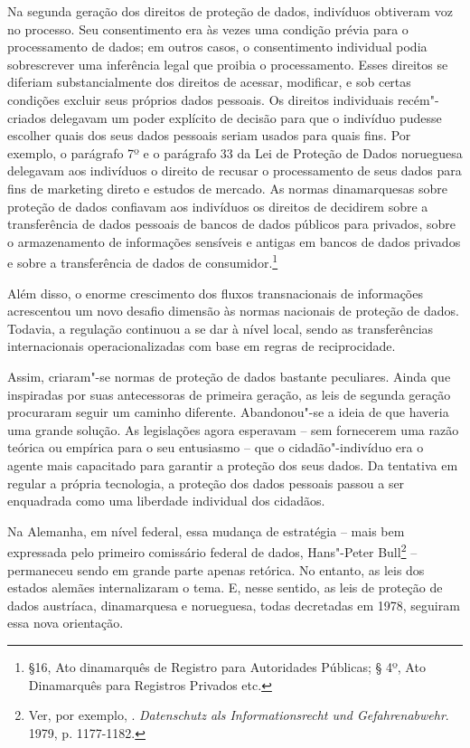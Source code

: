 Na segunda geração dos direitos de proteção de dados, indivíduos
obtiveram voz no processo. Seu consentimento era às vezes uma condição
prévia para o processamento de dados; em outros casos, o consentimento
individual podia sobrescrever uma inferência legal que proibia o
processamento. Esses direitos se diferiam substancialmente dos direitos
de acessar, modificar, e sob certas condições excluir seus próprios
dados pessoais. Os direitos individuais recém"-criados delegavam um poder
explícito de decisão para que o indivíduo pudesse escolher quais dos
seus dados pessoais seriam usados para quais fins. Por exemplo, o
parágrafo 7º e o parágrafo 33 da Lei de Proteção de Dados norueguesa
delegavam aos indivíduos o direito de recusar o processamento de seus
dados para fins de marketing direto e estudos de mercado. As normas
dinamarquesas sobre proteção de dados confiavam aos indivíduos os
direitos de decidirem sobre a transferência de dados pessoais de bancos
de dados públicos para privados, sobre o armazenamento de informações
sensíveis e antigas em bancos de dados privados e sobre a transferência
de dados de consumidor.\footnote{§16, Ato dinamarquês de Registro para
  Autoridades Públicas; § 4º, Ato Dinamarquês para Registros Privados
  etc.}

Além disso, o enorme crescimento dos fluxos transnacionais de
informações acrescentou um novo desafio dimensão às normas nacionais de
proteção de dados. Todavia, a regulação continuou a se dar à nível
local, sendo as transferências internacionais operacionalizadas com base
em regras de reciprocidade.

Assim, criaram"-se normas de proteção de dados bastante peculiares. Ainda
que inspiradas por suas antecessoras de primeira geração, as leis de
segunda geração procuraram seguir um caminho diferente. Abandonou"-se a
ideia de que haveria uma grande solução. As legislações agora esperavam
-- sem fornecerem uma razão teórica ou empírica para o seu entusiasmo
-- que o cidadão"-indivíduo era o agente mais capacitado para garantir a
proteção dos seus dados. Da tentativa em regular a própria tecnologia, a
proteção dos dados pessoais passou a ser enquadrada como uma liberdade
individual dos cidadãos.

Na Alemanha, em nível federal, essa mudança de estratégia -- mais bem
expressada pelo primeiro comissário federal de dados, Hans"-Peter
Bull\footnote{Ver, por exemplo, . \emph{Datenschutz als
  Informationsrecht und Gefahrenabwehr}.  1979, p. 1177-1182.} --
permaneceu sendo em grande parte apenas retórica. No entanto, as leis
dos estados alemães internalizaram o tema. E, nesse sentido, as leis de
proteção de dados austríaca, dinamarquesa e norueguesa, todas decretadas
em 1978, seguiram essa nova orientação.

